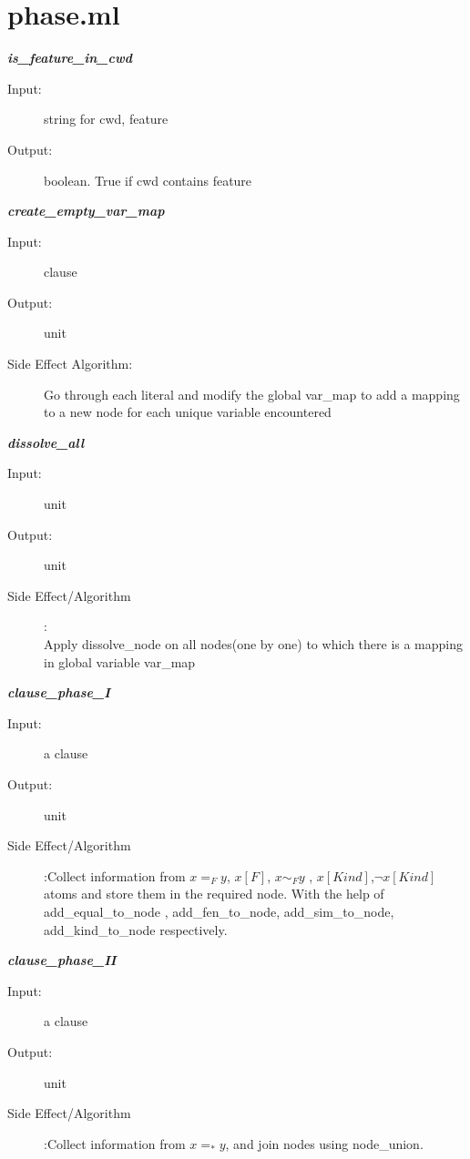 \documentclass[12pt]{article}
\begin{document}
\section{phase.ml}
\begin{description}

\item \textbf{\textit{is\_feature\_in\_cwd}}
\begin{description}
    \item[Input:] string for cwd, feature
    \item[Output:] boolean. True if cwd contains feature
\end{description}

\item \textbf{\textit{create\_empty\_var\_map}}
\begin{description}
    \item[Input:] clause
    \item[Output:] unit
    \item[Side Effect Algorithm:]  Go through each literal and modify the global var\_map to add a mapping to a new node for each unique variable encountered
\end{description}

\item \textbf{\textit{dissolve\_all}}
\begin{description}
    \item[Input:] unit
    \item[Output:] unit
    \item[Side Effect/Algorithm]:\\Apply dissolve\_node on all nodes(one by one) to which there is a mapping in global variable var\_map
\end{description}

\item \textbf{\textit{clause\_phase\_I}}
\begin{description}
    \item[Input:] a clause
    \item[Output:] unit
    \item[Side Effect/Algorithm]:Collect information from  $x=_F y $,  $x[F]$, $x \sim_F y$ , $x[Kind]$,$\lnot x[Kind]$ atoms and store them in the required node. With the help of add\_equal\_to\_node , add\_fen\_to\_node, add\_sim\_to\_node, add\_kind\_to\_node respectively.
\end{description}

\item \textbf{\textit{clause\_phase\_II}}
\begin{description}
    \item[Input:] a clause
    \item[Output:] unit
    \item[Side Effect/Algorithm]:Collect information from  $x=_* y $, and join nodes using  node\_union.
\end{description}



\end{description}
\end{document}
